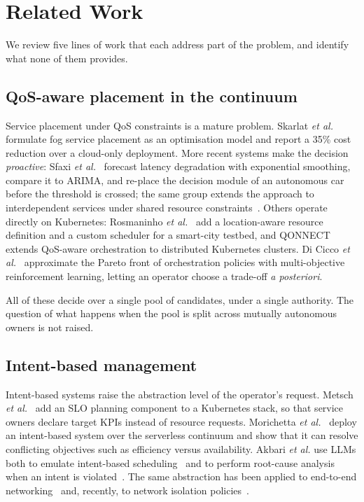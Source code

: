 \documentclass[conference]{IEEEtran}
\begin{document}
\section{Related Work}
\label{sec:related}

We review five lines of work that each address part of the problem, and
identify what none of them provides.

\subsection{QoS-aware placement in the continuum}

Service placement under QoS constraints is a mature problem. Skarlat
\emph{et al.}~\cite{skarlat2017} formulate fog service placement as an
optimisation model and report a 35\% cost reduction over a cloud-only
deployment. More recent systems make the decision \emph{proactive}: Sfaxi
\emph{et al.}~\cite{sfaxi2024tnsm} forecast latency degradation with
exponential smoothing, compare it to ARIMA, and re-place the decision module
of an autonomous car before the threshold is crossed; the same group extends
the approach to interdependent services under shared resource
constraints~\cite{sfaxi2025aidriven}. Others operate directly on Kubernetes:
Rosmaninho \emph{et al.}~\cite{rosmaninho2024} add a location-aware resource
definition and a custom scheduler for a smart-city testbed, and
QONNECT~\cite{qonnect2025} extends QoS-aware orchestration to distributed
Kubernetes clusters. Di Cicco \emph{et al.}~\cite{dicicco2025} approximate the
Pareto front of orchestration policies with multi-objective reinforcement
learning, letting an operator choose a trade-off \emph{a posteriori}.

All of these decide over a single pool of candidates, under a single
authority. The question of what happens when the pool is split across
mutually autonomous owners is not raised.

\subsection{Intent-based management}

Intent-based systems raise the abstraction level of the operator's request.
Metsch \emph{et al.}~\cite{metsch2023} add an SLO planning component to a
Kubernetes stack, so that service owners declare target KPIs instead of
resource requests. Morichetta \emph{et al.}~\cite{morichetta2023} deploy an
intent-based system over the serverless continuum and show that it can
resolve conflicting objectives such as efficiency versus availability.
Akbari \emph{et al.} use LLMs both to emulate intent-based
scheduling~\cite{akbari2024icontinuum} and to perform root-cause analysis
when an intent is violated~\cite{akbari2025intentcontinuum}. The same
abstraction has been applied to end-to-end networking~\cite{velasco2023} and,
recently, to network isolation policies~\cite{pizzato2026}.
\end{document}
